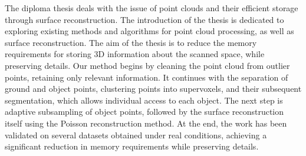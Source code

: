 The diploma thesis deals with the issue of point clouds and their efficient storage through surface reconstruction. The introduction of the thesis is dedicated to exploring existing methods and algorithms for point cloud processing, as well as surface reconstruction. The aim of the thesis is to reduce the memory requirements for storing 3D information about the scanned space, while preserving details. Our method begins by cleaning the point cloud from outlier points, retaining only relevant information. It continues with the separation of ground and object points, clustering points into supervoxels, and their subsequent segmentation, which allows individual access to each object. The next step is adaptive subsampling of object points, followed by the surface reconstruction itself using the Poisson reconstruction method. At the end, the work has been validated on several datasets obtained under real conditions, achieving a significant reduction in memory requirements while preserving details.